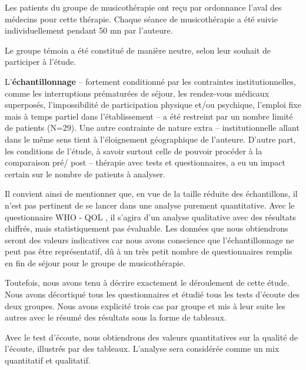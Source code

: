  Les patients du groupe de musicothérapie  ont reçu par ordonnance 
 l'aval des médecins pour cette thérapie. 
 Chaque séance de musicothérapie a été suivie individuellement pendant 50 mn par l'auteure.
 
 
 Le groupe témoin a été constitué de manière neutre, selon leur souhait de participer à l'étude.
 
 
 L'\textbf{échantillonnage} -- fortement conditionné par les contraintes
 institutionnelles, comme les interruptions prématurées de séjour, les rendez-vous
 médicaux superposés, l'impossibilité de participation physique et/ou
 psychique,
 l'emploi fixe mais à
 temps partiel dans l'établissement -- a été restreint  par un nombre limité de
 patients (N=29).
 Une autre contrainte de nature extra -- institutionnelle allant dans le
 même sens tient à l'éloignement géographique de l'auteure.
 D'autre part, les conditions de l'étude,
 à savoir surtout celle de pouvoir procéder à la  comparaison pré/ post -- thérapie avec tests et 
 questionnaires, a eu un impact 
 certain sur le nombre de patients à analyser.
 
  Il convient ainsi de mentionner que, en vue de la taille réduite des échantillons, il n'est pas
 pertinent de se lancer dans une analyse purement
 quantitative.
  Avec le questionnaire WHO -  QOL , il  s'agira d'un analyse qualitative avec des résultats chiffrés, mais 
  statistiquement pas évaluable. 
  Les données que nous obtiendrons seront des valeurs indicatives car nous avons conscience que 
 l'échantillonnage ne
 peut pas être représentatif, dû à un très petit nombre 
 de
 questionnaires remplis en fin de séjour pour le groupe de musicothérapie.
 
 Toutefois, nous avons tenu à décrire exactement le déroulement de cette étude. Nous avons décortiqué 
 tous les questionnaires et étudié tous les tests d'écoute des deux groupes.
 Nous avons explicité trois cas par groupe  et mis à leur suite les autres avec le résumé des résultats 
 sous la forme de tableaux.
 
 
 Avec le test d'écoute, nous obtiendrons des valeurs quantitatives sur la qualité de l'écoute, illustrés par 
 des tableaux.
 L'analyse sera considérée comme un mix quantitatif et qualitatif.
 


